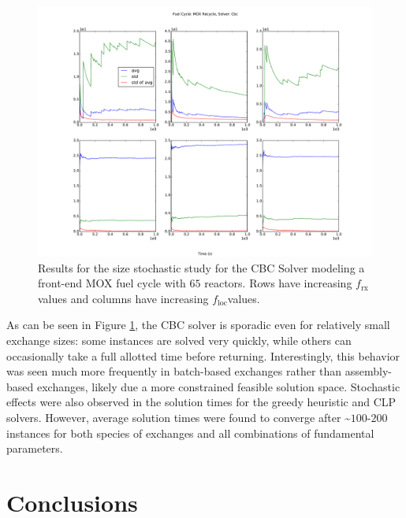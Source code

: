 \documentclass{anstrans}
\newcommand{\frx}{$f_{\text{rx}}$}
\newcommand{\floc}{$f_{\text{loc}}$}
\begin{document}
\begin{figure}
  \begin{center}
    \includegraphics[width=1.5\columnwidth]{1k_avg_front_time_fc1_solvercbc.pdf}
    \caption[]{
      \label{fig:cbc_stochastic}
      Results for the size stochastic study for the CBC Solver modeling a
      front-end MOX fuel cycle with $65$ reactors. Rows have increasing \frx
      values and columns have increasing \floc values.  }
  \end{center}
\end{figure}

As can be seen in Figure \ref{fig:cbc_stochastic}, the CBC solver is sporadic
even for relatively small exchange sizes: some instances are solved very
quickly, while others can occasionally take a full allotted time before
returning. Interestingly, this behavior was seen much more frequently in
batch-based exchanges rather than assembly-based exchanges, likely due a more
constrained feasible solution space. Stochastic effects were also observed in
the solution times for the greedy heuristic and CLP solvers. However, average
solution times were found to converge after \textasciitilde$100$-$200$ instances
for both species of exchanges and all combinations of fundamental parameters.


\section{Conclusions}
\end{document}
